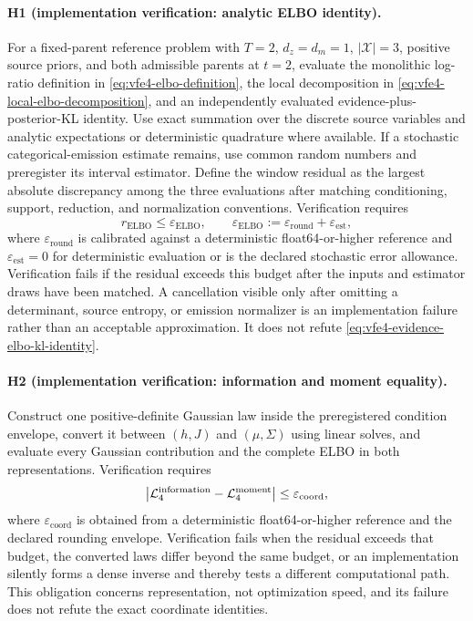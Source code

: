 \paragraph{H1 (implementation verification: analytic ELBO identity).}
For a fixed-parent reference problem with $T=2$, $d_z=d_m=1$, $|\mathcal X|=3$, positive source priors, and both admissible parents at $t=2$, evaluate the monolithic log-ratio definition in \cref{eq:vfe4-elbo-definition}, the local decomposition in \cref{eq:vfe4-local-elbo-decomposition}, and an independently evaluated evidence-plus-posterior-KL identity. Use exact summation over the discrete source variables and analytic expectations or deterministic quadrature where available. If a stochastic categorical-emission estimate remains, use common random numbers and preregister its interval estimator. Define the window residual as the largest absolute discrepancy among the three evaluations after matching conditioning, support, reduction, and normalization conventions. Verification requires
\begin{equation}
r_{\mathrm{ELBO}}
\leq\varepsilon_{\mathrm{ELBO}},
\qquad
\varepsilon_{\mathrm{ELBO}}
:=\varepsilon_{\mathrm{round}}+\varepsilon_{\mathrm{est}},
\label{eq:h1-elbo-residual-threshold}
\end{equation}
where $\varepsilon_{\mathrm{round}}$ is calibrated against a deterministic float64-or-higher reference and $\varepsilon_{\mathrm{est}}=0$ for deterministic evaluation or is the declared stochastic error allowance. Verification fails if the residual exceeds this budget after the inputs and estimator draws have been matched. A cancellation visible only after omitting a determinant, source entropy, or emission normalizer is an implementation failure rather than an acceptable approximation. It does not refute \cref{eq:vfe4-evidence-elbo-kl-identity}.

\paragraph{H2 (implementation verification: information and moment equality).}
Construct one positive-definite Gaussian law inside the preregistered condition envelope, convert it between $(h,J)$ and $(\mu,\Sigma)$ using linear solves, and evaluate every Gaussian contribution and the complete ELBO in both representations. Verification requires
\begin{equation}
\left|
\mathcal L_4^{\mathrm{information}}
-\mathcal L_4^{\mathrm{moment}}
\right|
\leq\varepsilon_{\mathrm{coord}},
\label{eq:h2-coordinate-equality-threshold}
\end{equation}
where $\varepsilon_{\mathrm{coord}}$ is obtained from a deterministic float64-or-higher reference and the declared rounding envelope. Verification fails when the residual exceeds that budget, the converted laws differ beyond the same budget, or an implementation silently forms a dense inverse and thereby tests a different computational path. This obligation concerns representation, not optimization speed, and its failure does not refute the exact coordinate identities.

